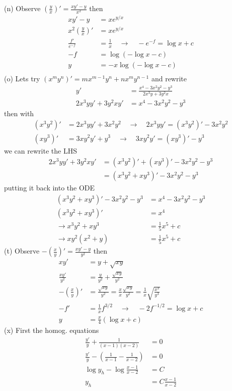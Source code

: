 \documentclass[10pt,a4paper]{book}
\theoremstyle{definition}
\begin{document}
(n) Observe $\left(\frac{y}{x}\right)'=\frac{xy'-y}{x^2}$ then
\begin{align}
xy'-y&=xe^{y/x}\\
x^2\left(\frac{y}{x}\right)'&=xe^{y/x}\\
\frac{f'}{e^{-f}}&=\frac{1}{x}\quad\rightarrow\quad -e^{-f}=\log x+c\\
-f&=\log(-\log x-c)\\
y&=-x\log(-\log x-c)\\
\end{align}
(o) Lets try $(x^my^n)'=mx^{m-1}y^n+nx^my^{n-1}$ and rewrite
\begin{align}
y'&=\frac{x^4-3x^2y^2-y^3}{2x^3y+3y^2x}\\
2x^3yy'+3y^2xy'&=x^4-3x^2y^2-y^3
\end{align}
then with
\begin{align}
(x^3y^2)'&=2x^3yy'+3x^2y^2\quad\rightarrow\quad2x^3yy'=(x^3y^2)'-3x^2y^2\\
(xy^3)'&=3xy^2y'+y^3\quad\rightarrow\quad3xy^2y'=(xy^3)'-y^3
\end{align}
we can rewrite the LHS
\begin{align}
2x^3yy'+3y^2xy'&=(x^3y^2)'+(xy^3)'-3x^2y^2-y^3\\
&=(x^3y^2+xy^3)'-3x^2y^2-y^3
\end{align}
putting it back into the ODE
\begin{align}
(x^3y^2+xy^3)'-3x^2y^2-y^3&=x^4-3x^2y^2-y^3\\
(x^3y^2+xy^3)'&=x^4\\
\rightarrow x^3y^2+xy^3&=\frac{1}{5}x^5+c\\
\rightarrow xy^2(x^2+y)&=\frac{1}{5}x^5+c
\end{align}
(t) Observe $-\left(\frac{x}{y}\right)'=\frac{xy'-y}{y^2}$ then
\begin{align}
xy'&=y+\sqrt{xy}\\
\frac{xy'}{y^2}&=\frac{y}{y^2}+\frac{\sqrt{xy}}{y^2}\\
-\left(\frac{x}{y}\right)'&=\frac{\sqrt{xy}}{y^2}=\frac{x}{x}\frac{\sqrt{xy}}{y^2}=\frac{1}{x}\sqrt{\frac{x^3}{y^3}}\\
-f'&=\frac{1}{x}f^{3/2}\quad\rightarrow\quad-2f^{-1/2}=\log x+c\\
y&=\frac{x}{4}(\log x+c)
\end{align}
(x) First the homog. equations
\begin{align}
\frac{y'}{y}+\frac{1}{(x-1)(x-2)}&=0\\
\frac{y'}{y}-\left(\frac{1}{x-1}-\frac{1}{x-2}\right)&=0\\
\log y_h-\log\frac{x-1}{x-2}&=C\\
y_h&=C\frac{x-1}{x-2}
\end{align}
\end{document}
